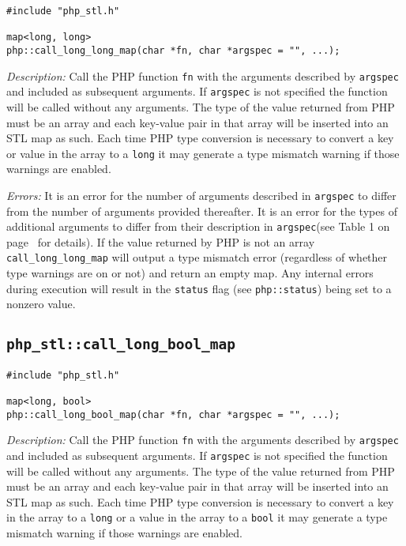 \documentclass[11pt,titlepage]{article}
\begin{document}
\begin{verbatim}
#include "php_stl.h"

map<long, long> 
php::call_long_long_map(char *fn, char *argspec = "", ...);
\end{verbatim}

\emph{Description:} Call the PHP function \verb|fn| with the arguments described by \verb|argspec| and included as subsequent arguments. If \verb|argspec| is not specified the function will be called without any arguments. The type of the value returned from PHP must be an array and each key-value pair in that array will be inserted into an STL map as such. Each time PHP type conversion is necessary to convert a key or value in the array to a \verb|long| it may generate a type mismatch warning if those warnings are enabled.

\emph{Errors:} It is an error for the number of arguments described in \verb|argspec| to differ from the number of arguments provided thereafter. It is an error for the types of additional arguments to differ from their description in \verb|argspec|(see Table 1 on page~\pageref{Table1} for details). If the value returned by PHP is not an array \verb|call_long_long_map| will output a type mismatch error (regardless of whether type warnings are on or not) and return an empty map. Any internal errors during execution will result in the \verb|status| flag (see \verb|php::status|) being set to a nonzero value.


\subsection{\texttt{php\_stl::call\_long\_bool\_map}}

\begin{verbatim}
#include "php_stl.h"

map<long, bool> 
php::call_long_bool_map(char *fn, char *argspec = "", ...);
\end{verbatim}

\emph{Description:} Call the PHP function \verb|fn| with the arguments described by \verb|argspec| and included as subsequent arguments. If \verb|argspec| is not specified the function will be called without any arguments. The type of the value returned from PHP must be an array and each key-value pair in that array will be inserted into an STL map as such. Each time PHP type conversion is necessary to convert a key in the array to a \verb|long| or a value in the array to a \verb|bool| it may generate a type mismatch warning if those warnings are enabled.
\end{document}
